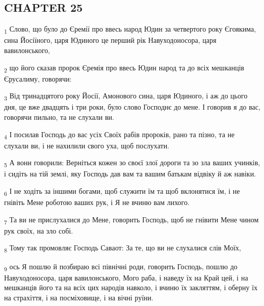 \subsection{CHAPTER 25}
\begin{tcolorbox}
\textsubscript{1} Слово, що було до Єремії про ввесь народ Юдин за четвертого року Єгоякима, сина Йосіїного, царя Юдиного це перший рік Навуходоносора, царя вавилонського,
\end{tcolorbox}
\begin{tcolorbox}
\textsubscript{2} що його сказав пророк Єремія про ввесь Юдин народ та до всіх мешканців Єрусалиму, говорячи:
\end{tcolorbox}
\begin{tcolorbox}
\textsubscript{3} Від тринадцятого року Йосії, Амонового сина, царя Юдиного, і аж до цього дня, це вже двадцять і три роки, було слово Господнє до мене. І говорив я до вас, говорячи пильно, та не слухали ви.
\end{tcolorbox}
\begin{tcolorbox}
\textsubscript{4} І посилав Господь до вас усіх Своїх рабів пророків, рано та пізно, та не слухали ви, і не нахилили свого уха, щоб послухати.
\end{tcolorbox}
\begin{tcolorbox}
\textsubscript{5} А вони говорили: Верніться кожен зо своєї злої дороги та зо зла ваших учинків, і сидіть на тій землі, яку Господь дав вам та вашим батькам відвіку й аж навіки.
\end{tcolorbox}
\begin{tcolorbox}
\textsubscript{6} І не ходіть за іншими богами, щоб служити їм та щоб вклонятися їм, і не гнівіть Мене роботою ваших рук, і Я не вчиню вам лихого.
\end{tcolorbox}
\begin{tcolorbox}
\textsubscript{7} Та ви не прислухалися до Мене, говорить Господь, щоб не гнівити Мене чином рук своїх, на зло собі.
\end{tcolorbox}
\begin{tcolorbox}
\textsubscript{8} Тому так промовляє Господь Саваот: За те, що ви не слухалися слів Моїх,
\end{tcolorbox}
\begin{tcolorbox}
\textsubscript{9} ось Я пошлю й позбираю всі північні роди, говорить Господь, пошлю до Навуходоносора, царя вавилонського, Мого раба, і наведу їх на Край цей, і на мешканців його та на всіх цих народів навколо, і вчиню їх закляттям, і оберну їх на страхіття, і на посміховище, і на вічні руїни.
\end{tcolorbox}
